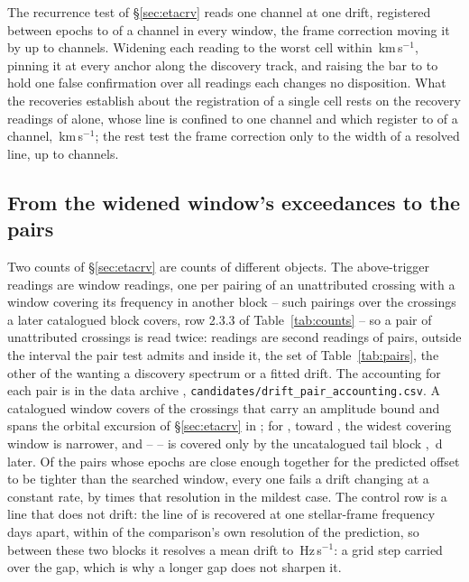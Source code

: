 The recurrence test of \S\ref{sec:etacrv} reads one channel at one drift,
registered between epochs to \RgBudgetChMed{} of a channel in every window,
the frame correction moving it by up to \ZtFrameChanMax{} channels. Widening
each reading to the worst cell within \RgTolKms\,km\,s$^{-1}$, pinning it at
every anchor along the discovery track, and raising the bar to \ZtTrialThr{}
to hold one false confirmation over all \RcNRepeatMeas{} readings each
changes no disposition. What the
recoveries establish about the registration of a single cell rests on the
\RgRegNUnres{} recovery readings of \RgRegStar{} alone, whose line is confined
to one channel and which register to \RgRegMaxCh{} of a channel,
\RgRegMaxKms\,km\,s$^{-1}$; the rest test the frame correction only to the
width of a resolved line, up to \RgResFwhmChMax{} channels.

\subsection{From the widened window's exceedances to the pairs}
\label{sec:pairacct}

Two counts of \S\ref{sec:etacrv} are counts of different objects. The
\WdNExc{} above-trigger readings are window readings, one per pairing of an
unattributed crossing with a window covering its frequency in another block
-- \WdNCov{} such pairings over the \PaNCovWinCross{} crossings a later
catalogued block covers, row 2.3.3 of Table~\ref{tab:counts} -- so a pair of
unattributed crossings is read twice: \PaNPairTwice{} readings are second
readings of \PaNPairRead{} pairs, \PaNPairBeyond{} outside the interval the
pair test admits and \PaNPairInside{} inside it, the set of
Table~\ref{tab:pairs}, the other \TjNCandLost{} of the \TjNCandPair{} wanting
a discovery spectrum or a fitted drift. The accounting for each pair is in
the data archive \citep{SIdeposit},
\texttt{candidates/\allowbreak drift\_pair\_accounting.csv}. A
catalogued window covers \WdNOrbTot{} of the \RcNExcl{} crossings that carry an
amplitude bound and spans the orbital excursion of \S\ref{sec:etacrv} in
\EcNSpan; for \EcNShort, toward \EcShortStarList, the widest covering window is
narrower, and \WdNNoCov{} -- \WdNoCovStar{} -- is covered only by the
uncatalogued tail block \texttt{\WdNoCovEb}, \WdNoCovSepD\,d later. Of the
\TjNPower{} pairs whose epochs are close enough together for the
predicted offset to be tighter than the searched window, every one fails a
drift changing at a constant rate, by \TjSigMin{} times that resolution in
the mildest case. The control row is a line that does not drift: the
\TjCtlLine{} line of \TjCtlStar{} is recovered at one stellar-frame frequency
\TjCtlDtD{} days apart, within \TjCtlNSig{} of the comparison's own
resolution of the prediction, so between these two blocks it resolves a mean
drift to \TjCtlDriftResHzS\,Hz\,s$^{-1}$: a grid step carried over the gap,
which is why a longer gap does not sharpen it.

